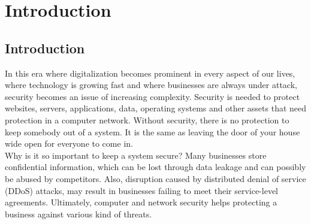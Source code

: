 \chapter{Introduction}
\label{cha:10}
%


\section{Introduction}

In this era where digitalization becomes prominent in every aspect of our lives, where technology is growing fast and where businesses are always under attack, security becomes an issue of increasing complexity. Security is needed to protect websites, servers, applications, data, operating systems and other assets that need protection in a computer network. Without security, there is no protection to keep somebody out of a system. It is the same as leaving the door of your house wide open for everyone to come in. \\

Why is it so important to keep a system secure?  Many businesses store confidential information, which can be lost through data leakage and can possibly be abused by competitors. Also, disruption caused by distributed denial of service (DDoS) attacks, may result in businesses failing to meet their service-level agreements. Ultimately, computer and network security helps protecting a business against various kind of threats. \\


